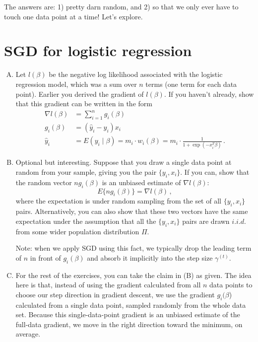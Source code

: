 \documentclass{mynotes}
\begin{document}
The answers are: 1) pretty darn random, and 2) so that we only ever have to touch one data point at a time!  Let's explore.

\section{SGD for logistic regression}


\begin{enumerate}[(A)]

\item Let $l(\beta)$ be the negative log likelihood associated with the logistic regression model, which was a sum over $n$ terms (one term for each data point).  Earlier you derived the gradient of $l(\beta)$.  If you haven't already, show that this gradient can be written in the form
$$
\begin{aligned}
\nabla l(\beta) &=  \sum_{i=1}^n g_i(\beta)  \\
g_i(\beta) &= (\hat y_i - y_i) x_i \\
\hat{y}_i &= E(y_i \mid \beta) = m_i \cdot w_i(\beta) = m_i \cdot \frac{1}{1 + \exp(-x_i^T \beta)} \, .
\end{aligned}
$$

\item Optional but interesting.  Suppose that you draw a single data point at random from your sample, giving you the pair $\{y_i, x_i\}$.  If you can, show that the random vector $n g_i(\beta)$ is an unbiased estimate of $\nabla l(\beta)$:
$$
E \{ n g_i(\beta) \} = \nabla l(\beta) \, ,
$$
where the expectation is under random sampling from the set of all $\{y_i, x_i\}$ pairs.  Alternatively, you can also show that these two vectors have the same expectation under the assumption that all the $\{y_i, x_i\}$ pairs are drawn $i.i.d.$ from some wider population distribution $\Pi$.

Note: when we apply SGD using this fact, we typically drop the leading term of $n$ in front of $g_i(\beta)$ and absorb it implicitly into the step size $\gamma^{(t)}$.

\item For the rest of the exercises, you can take the claim in (B) as given.  The idea here is that, instead of using the gradient calculated from all $n$ data points to choose our step direction in gradient descent, we use the gradient $g_i(\beta$) calculated from a single data point, sampled randomly from the whole data set.  Because this single-data-point gradient is an unbiased estimate of the full-data gradient, we move in the right direction toward the minimum, on average.


\end{enumerate}
\end{document}
